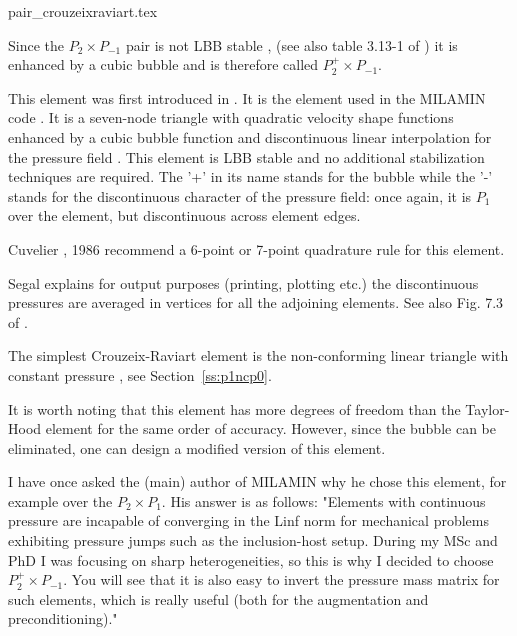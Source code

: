 \begin{flushright} {\tiny {\color{gray} pair\_crouzeixraviart.tex}} \end{flushright}

Since the $P_2\times P_{-1}$ pair is not LBB stable \cite[p179]{reddybook2}, 
(see also table 3.13-1 of \textcite{grsa})
it is enhanced by a cubic bubble and is therefore called $P_2^+\times P_{-1}$. 

This element was first introduced in \cite{crra73}.
It is the element used in the MILAMIN code \cite{daks08}.
It is a seven-node triangle with quadratic velocity shape 
functions enhanced by a cubic bubble function and discontinuous linear interpolation for 
the pressure field \cite{cuss86}. 
This element is LBB stable and no additional stabilization techniques are required\cite{elsw}.
The '+' in its name stands for the bubble while the '-' stands for the discontinuous
character of the pressure field: once again, it is $P_1$ over the element, but discontinuous
across element edges.

\begin{remark}
Cuvelier \etal, 1986 \cite{cuss86} recommend a 6-point or 7-point quadrature rule for this element.
\end{remark}

\begin{remark}
Segal \cite{segal} explains 
for output purposes (printing, plotting etc.) the discontinuous pressures are averaged 
in vertices for all the adjoining elements. See also Fig. 7.3 of \cite{cuss86}.
\end{remark}

\begin{remark}
The simplest Crouzeix-Raviart element is the non-conforming linear triangle 
with constant pressure \cite{cuss86}, see Section~\ref{ss:p1ncp0}.
\end{remark}

It is worth noting that this element has more degrees of freedom  than the 
Taylor-Hood element for the same order of accuracy. However, since the 
bubble can be eliminated, one can design a modified version of this element.

\begin{remark}
I have once asked the (main) author of MILAMIN why he chose this element, for 
example over the $P_2\times P_1$. His answer is as follows:
"Elements with continuous pressure  are incapable of converging in the Linf 
norm for mechanical problems exhibiting pressure jumps such as the inclusion-host setup. 
During my MSc and PhD I was focusing on sharp heterogeneities, so this is why I decided 
to choose $P_2^+\times P_{-1}$. 
You will see that it is also easy to invert the pressure mass matrix for such elements, 
which is really useful (both for the augmentation and preconditioning)."
\end{remark}

